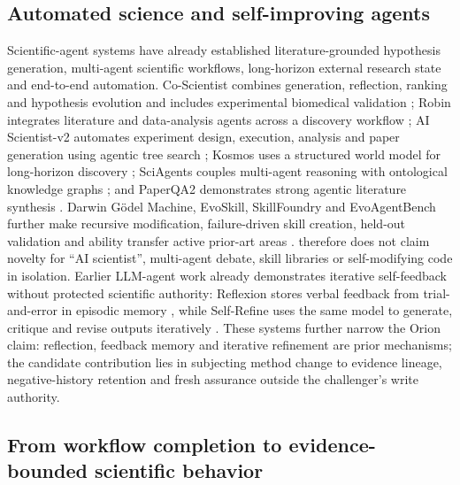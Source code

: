 \subsection{Automated science and self-improving agents}
Scientific-agent systems have already established literature-grounded hypothesis generation, multi-agent scientific workflows, long-horizon external research state and end-to-end automation. Co-Scientist combines generation, reflection, ranking and hypothesis evolution and includes experimental biomedical validation \cite{gottweis2026}; Robin integrates literature and data-analysis agents across a discovery workflow \cite{ghareeb2026}; AI Scientist-v2 automates experiment design, execution, analysis and paper generation using agentic tree search \cite{yamada2025}; Kosmos uses a structured world model for long-horizon discovery \cite{mitchener2025}; SciAgents couples multi-agent reasoning with ontological knowledge graphs \cite{ghafarollahi2024}; and PaperQA2 demonstrates strong agentic literature synthesis \cite{skarlinski2024}. Darwin G\"odel Machine, EvoSkill, SkillFoundry and EvoAgentBench further make recursive modification, failure-driven skill creation, held-out validation and ability transfer active prior-art areas \cite{zhang2025,alzubi2026,shen2026,gao2026}. \RAKL{} therefore does not claim novelty for ``AI scientist'', multi-agent debate, skill libraries or self-modifying code in isolation. Earlier LLM-agent work already demonstrates iterative self-feedback without protected scientific authority: Reflexion stores verbal feedback from trial-and-error in episodic memory \cite{shinn2023}, while Self-Refine uses the same model to generate, critique and revise outputs iteratively \cite{madaan2023}. These systems further narrow the Orion claim: reflection, feedback memory and iterative refinement are prior mechanisms; the candidate contribution lies in subjecting method change to evidence lineage, negative-history retention and fresh assurance outside the challenger's write authority.

\subsection{From workflow completion to evidence-bounded scientific behavior}

